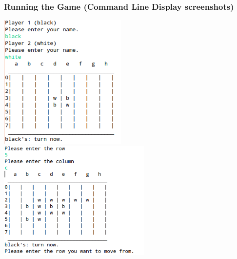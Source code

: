 \documentclass[english]{article}
\begin{document}
\subsubsection*{Running the Game (Command Line Display screenshots)}
\includegraphics[width=2.5in]{screen2}
\includegraphics[width=3in]{screen1}
\end{document}
